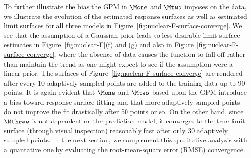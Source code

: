 To further illustrate the bias the GPM in $\Mone$ and $\Mtwo$ imposes on the data, we illustrate the evolution of the estimated response surfaces as well as estimated limit surfaces for all three models in Figure~\ref{fig:nuclear-F-surface-converge}.
%
We see that the assumption of a Gaussian prior leads to less desirable limit surface estimates in Figure~\ref{fig:nuclear-F}(f) and (g) and also in Figure~\ref{fig:nuclear-F-surface-converge}, where the absence of data causes the function to fall off rather than maintain the trend as one might expect to see if the assumption were a linear prior.
%
The surfaces of Figure~\ref{fig:nuclear-F-surface-converge} are rendered after every 10 adaptively sampled points are added to the training data up to 90 points.
%
It is again evident that $\Mone$ and $\Mtwo$ based upon the GPM introduce a bias toward response surface fitting and that more adaptively sampled points do not improve the fit drastically after 50 points or so.
%
On the other hand, since $\Mthree$ is not dependent on the prediction model, it converges to the true limit surface (through visual inspection) reasonably fast after only 30 adaptively sampled points.
%
In the next section, we complement this qualitative analysis with a quantative one by evaluating the root-mean-square error (RMSE) convergence.


